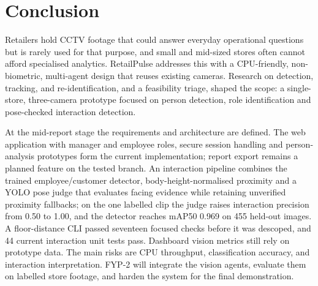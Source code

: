 \chapter{Conclusion}
Retailers hold CCTV footage that could answer everyday operational questions but is rarely used for that purpose, and small and mid-sized stores often cannot afford specialised analytics. RetailPulse addresses this with a CPU-friendly, non-biometric, multi-agent design that reuses existing cameras. Research on detection, tracking, and re-identification, and a feasibility triage, shaped the scope: a single-store, three-camera prototype focused on person detection, role identification and pose-checked interaction detection.

At the mid-report stage the requirements and architecture are defined. The web application with manager and employee roles, secure session handling and person-analysis prototypes form the current implementation; report export remains a planned feature on the tested branch. An interaction pipeline combines the trained employee/customer detector, body-height-normalised proximity and a YOLO pose judge that evaluates facing evidence while retaining unverified proximity fallbacks; on the one labelled clip the judge raises interaction precision from 0.50 to 1.00, and the detector reaches mAP50 0.969 on 455 held-out images. A floor-distance CLI passed seventeen focused checks before it was descoped, and 44 current interaction unit tests pass. Dashboard vision metrics still rely on prototype data. The main risks are CPU throughput, classification accuracy, and interaction interpretation. FYP-2 will integrate the vision agents, evaluate them on labelled store footage, and harden the system for the final demonstration.
